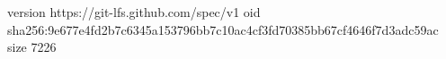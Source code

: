 version https://git-lfs.github.com/spec/v1
oid sha256:9e677e4fd2b7c6345a153796bb7c10ac4cf3fd70385bb67cf4646f7d3adc59ac
size 7226
